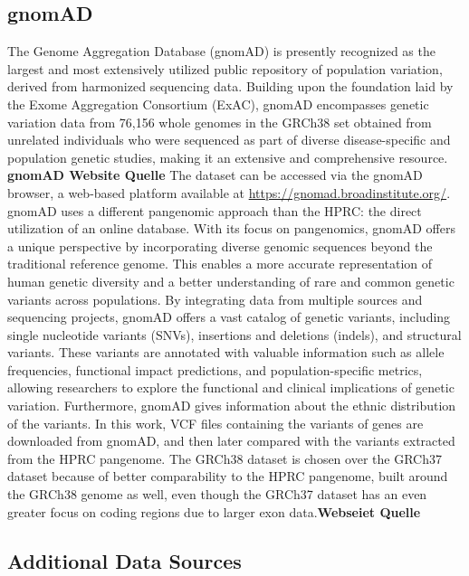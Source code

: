\documentclass[a4paper,11pt,twoside,openright]{report}
\begin{document}
\subsection{gnomAD}
The Genome Aggregation Database (gnomAD) is presently recognized as the largest and most extensively utilized public repository of population variation, derived from harmonized sequencing data. \cite{gudmundsson2022variant} 
Building upon the foundation laid by the Exome Aggregation Consortium (ExAC), gnomAD encompasses genetic variation data from 76,156 whole genomes in the GRCh38 set obtained from unrelated individuals who were sequenced as part of diverse disease-specific and population genetic studies, making it an extensive and comprehensive resource. \cite{koch2020exploring}\textbf{gnomAD Website Quelle}
The dataset can be accessed via the gnomAD browser, a web-based platform available at \href{https://gnomad.broadinstitute.org/}{https://gnomad.broadinstitute.org/}.
gnomAD uses a different pangenomic approach than the HPRC: the direct utilization of an online database.
With its focus on pangenomics, gnomAD offers a unique perspective by incorporating diverse genomic sequences beyond the traditional reference genome. This enables a more accurate representation of human genetic diversity and a better understanding of rare and common genetic variants across populations. 
By integrating data from multiple sources and sequencing projects, gnomAD offers a vast catalog of genetic variants, including single nucleotide variants (SNVs), insertions and deletions (indels), and structural variants. These variants are annotated with valuable information such as allele frequencies, functional impact predictions, and population-specific metrics, allowing researchers to explore the functional and clinical implications of genetic variation.
Furthermore, gnomAD gives information about the ethnic distribution of the variants. 
In this work, VCF files containing the variants of genes are downloaded from gnomAD, and then later compared with the variants extracted from the HPRC pangenome. The GRCh38 dataset is chosen over the GRCh37 dataset because of better comparability to the HPRC pangenome, built around the GRCh38 genome as well, even though the GRCh37 dataset has an even greater focus on coding regions due to larger exon data.\textbf{Webseiet Quelle}

\subsection{Additional Data Sources}
\end{document}
